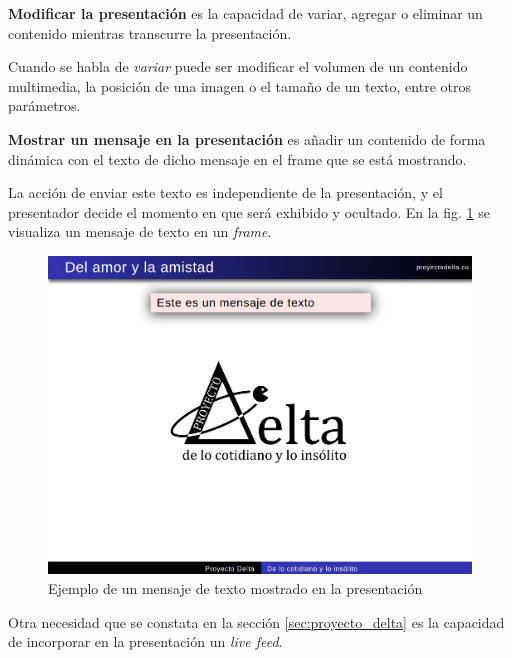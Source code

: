 		\begin{definition}
		\label{def:presentation_modification}
			\textbf{Modificar la presentación} es la capacidad de variar, agregar o eliminar un contenido mientras transcurre la presentación.
		\end{definition}

		Cuando se habla de \textit{variar} puede ser modificar el volumen de un contenido multimedia, la posición de una imagen o el tamaño de un texto, entre otros parámetros.


		\begin{definition}
		\label{def:message}
			\textbf{Mostrar un mensaje en la presentación} es añadir un contenido de forma dinámica con el texto de dicho mensaje en el \textnormal{frame} que se está mostrando. 
		\end{definition}

		La acción de enviar este texto es independiente de la presentación, y el presentador decide el momento en que será exhibido y ocultado. En la fig. \ref{fig:msg} se visualiza un mensaje de texto en un \textit{frame}.


		\begin{figure}[tb]
			\centering
			\includegraphics[width=12cm]{img/text_msg}
			\caption{Ejemplo de un mensaje de texto mostrado en la presentación}
			\label{fig:msg}
		\end{figure}

		Otra necesidad que se constata en la sección \ref{sec:proyecto_delta} es la capacidad de incorporar en la presentación un \textit{live feed}.

